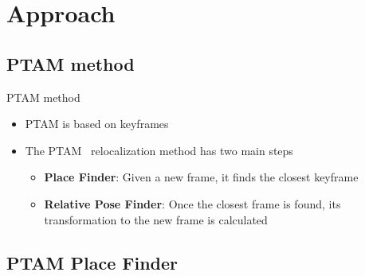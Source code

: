 
\section{Approach}
\label{sec:approach}

\subsection{PTAM method}
\label{sub:ptam_method}


\begin{frame}[t]{PTAM method}
  
  \begin{itemize}
    \item PTAM is based on keyframes
    \item The PTAM~\cite{KleinMurray2007} relocalization method has two main steps
      \begin{itemize}
        \item \textbf{Place Finder}: Given a new frame, it finds the closest keyframe
        \item \textbf{Relative Pose Finder}: Once the closest frame is found, its transformation to the new frame is calculated
      \end{itemize}
  \end{itemize}
\end{frame}

\subsection{PTAM Place Finder}
\label{sub:ptam_place_finder}


